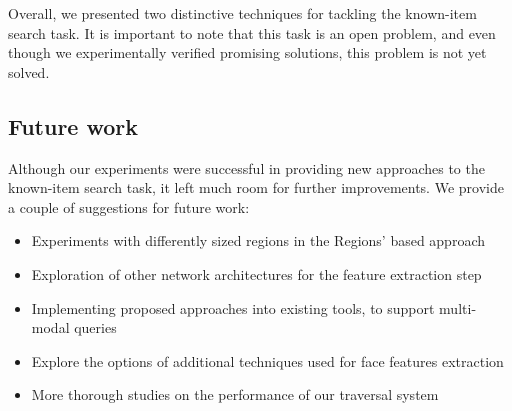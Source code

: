 Overall, we presented two distinctive techniques for tackling the known-item search task. It is important to note that this task is an open problem, and even though we experimentally verified promising solutions, this problem is not yet solved. 

\subsection*{Future work}

Although our experiments were successful in providing new approaches to the known-item search task, it left much room for further improvements. We provide a couple of suggestions for future work:

\begin{itemize}
    \item Experiments with differently sized regions in the Regions' based approach
    \item Exploration of other network architectures for the feature extraction step
    \item Implementing proposed approaches into existing tools, to support multi-modal queries
    \item Explore the options of additional techniques used for face features extraction
    \item More thorough studies on the performance of our traversal system
\end{itemize}


